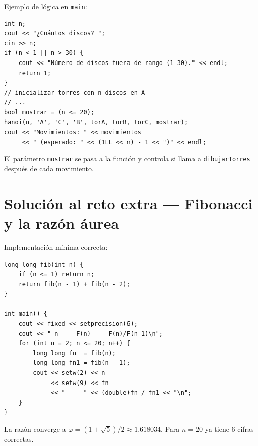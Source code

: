 \documentclass[12pt, oneside]{article}
\begin{document}
\begin{notaprofesor}
  Ejemplo de lógica en \texttt{main}:
\begin{verbatim}
int n;
cout << "¿Cuántos discos? ";
cin >> n;
if (n < 1 || n > 30) {
    cout << "Número de discos fuera de rango (1-30)." << endl;
    return 1;
}
// inicializar torres con n discos en A
// ...
bool mostrar = (n <= 20);
hanoi(n, 'A', 'C', 'B', torA, torB, torC, mostrar);
cout << "Movimientos: " << movimientos
     << " (esperado: " << (1LL << n) - 1 << ")" << endl;
\end{verbatim}
  El parámetro \texttt{mostrar} se pasa a la función y controla si
  llama a \texttt{dibujarTorres} después de cada movimiento.
\end{notaprofesor}

\section{Solución al reto extra — Fibonacci y la razón áurea}

\begin{notaprofesor}
  Implementación mínima correcta:

\begin{verbatim}
long long fib(int n) {
    if (n <= 1) return n;
    return fib(n - 1) + fib(n - 2);
}

int main() {
    cout << fixed << setprecision(6);
    cout << " n     F(n)     F(n)/F(n-1)\n";
    for (int n = 2; n <= 20; n++) {
        long long fn  = fib(n);
        long long fn1 = fib(n - 1);
        cout << setw(2) << n
             << setw(9) << fn
             << "     " << (double)fn / fn1 << "\n";
    }
}
\end{verbatim}

  La razón converge a $\varphi = (1+\sqrt{5})/2 \approx 1.618034$.
  Para $n = 20$ ya tiene 6 cifras correctas.
\end{notaprofesor}
\end{document}
